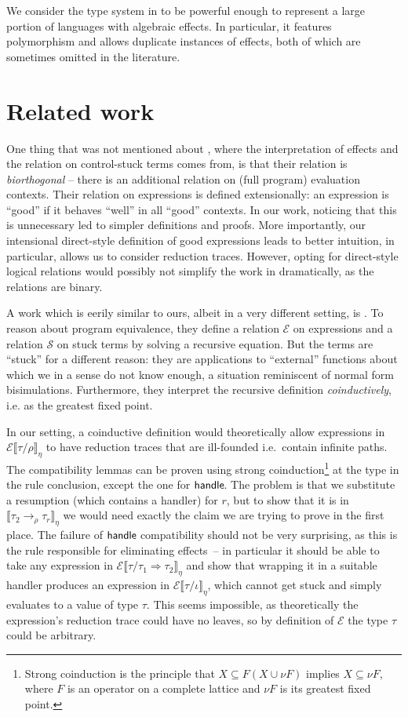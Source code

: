 \documentclass[a4paper, 12pt]{report}
\newcommand{\keyword}[1]{\textsf{\textup{#1}}}
\newcommand{\Handle}{\keyword{handle}\;}
\newcommand{\E}{\mathcal{E}}
\renewcommand{\S}{\mathcal{S}}
\newcommand{\+}{\enspace}
\begin{document}
We consider the type system in \cite{hwc} to be powerful enough to represent
a large portion of languages with algebraic effects.
In particular, it features polymorphism and allows duplicate instances of effects,
both of which are sometimes omitted in the literature.

\section{Related work}

One thing that was not mentioned about \cite{hwc}, where the interpretation of effects
and the relation on control-stuck terms comes from,
is that their relation is {\em biorthogonal}
– there is an additional relation on (full program) evaluation contexts.
Their relation on expressions is defined extensionally:
an expression is ``good'' if it behaves ``well'' in all ``good'' contexts.
In our work, noticing that this is unnecessary led to simpler definitions and proofs.
More importantly, our intensional direct-style definition of good expressions leads to
better intuition, in particular, allows us to consider reduction traces.
However, opting for direct-style logical relations would possibly not simplify the work
in \cite{hwc} dramatically,
as the relations are binary.

A work which is eerily similar to ours, albeit in a very different setting, is \cite{marriage}.
To reason about program equivalence,
they define a relation $\E$ on expressions
and a relation $\S$ on stuck terms
by solving a recursive equation.
But the terms are ``stuck'' for a different reason:
they are applications to ``external'' functions about which we in a sense do not know enough,
a situation reminiscent of normal form bisimulations.
Furthermore, they interpret the recursive definition {\em coinductively},
i.e. as the greatest fixed point.

In our setting, a coinductive definition would theoretically allow
expressions in $\E⟦τ/ρ⟧_η$ to have reduction traces that are ill-founded
i.e.\ contain infinite paths.
The compatibility lemmas can be proven using strong coinduction\footnote{
	Strong coinduction is the principle that $X ⊆ F(X ∪ νF)$ implies $X ⊆ νF$,
	where $F$ is an operator on a complete lattice and $νF$ is its greatest fixed point.
}
	at the type in the rule conclusion,
except the one for $\Handle\!\!$.
The problem is that we substitute a resumption
(which contains a handler) for $r$,
but to show that it is in $⟦τ_2 →_ρ τ_r⟧_η$
we would need exactly the claim we are trying to prove in the first place.
The failure of $\Handle\!\!$ compatibility should not be very surprising,
as this is the rule responsible for eliminating effects –
in particular it should be able to take
any expression in $\E⟦τ/τ_1 \Rightarrow τ_2⟧_η$ and show that wrapping it in a
suitable handler produces an expression in $\E⟦τ/ι⟧_η$, which cannot get
stuck and simply evaluates to a value of type $τ$.
This seems impossible,
as theoretically the expression's reduction trace could have no
leaves, so by definition of $\E$ the type $τ$ could be arbitrary.
\end{document}

